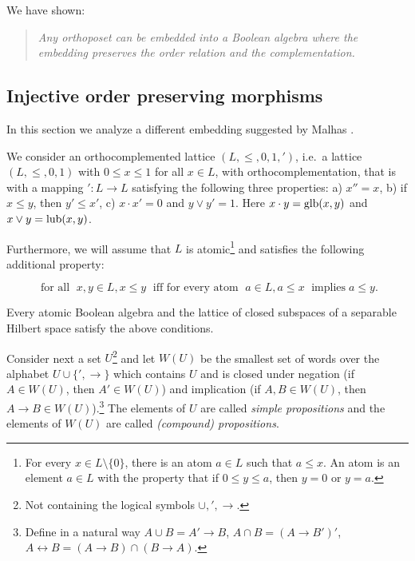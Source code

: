 We have shown:
\begin{quote}
{\em Any orthoposet can be embedded into a Boolean algebra where the
embedding preserves the order relation and the complementation.}
\end{quote}





\subsection{Injective order preserving morphisms}
\label{section:injorder}





In this section we analyze a different embedding suggested by Malhas
\cite{malhas-87,malhas-92}.

We consider
an orthocomplemented lattice $(L, \leq, 0, 1, ')$, i.e.\
a lattice $(L, \leq, 0, 1)$ with $0\leq x\leq 1$
for all $x\in L$, with  orthocomplementation, that is with a mapping
$' : L \rightarrow L$ satisfying the following three properties: a) $x''=x$,
b) if $x\leq y$, then $y'\leq x'$, c) $x\cdot x'=0$ and $y \vee y'=1$. Here
$x\cdot y= {\rm glb} (x,y)$ and $x \vee y = {\rm lub}(x,y) $.


Furthermore, we will assume that $L$ is atomic\footnote{For every
$x\in L\setminus\{0\}$, there is an atom $a\in L$ such that $a\leq x$.
An atom is an element $a\in L$ with the property that if $0\leq y \leq a$,
then $y=0$ or $y=a$.} and satisfies the following additional property:

\begin{equation}
\label{*}
\mbox{ for all }\; x,y \in L, x \leq y \; \mbox{ iff for every atom }\;
a\in L, a\leq x\;
\mbox{ implies} \; a\leq y.
\end{equation}

Every atomic Boolean algebra and the lattice of closed subspaces of a separable
Hilbert space satisfy the above conditions.

Consider next a set $U$\footnote{Not containing the logical symbols $\cup,
', \rightarrow $.}
 and let $W(U)$ be the smallest set of words over the alphabet
$U \cup \{', \rightarrow\}$ which contains $U$ and
is closed under negation (if $A\in W(U)$, then $ A' \in W(U)$) and
implication (if
$A, B
\in W(U)$, then
$A \rightarrow B \in W(U)$).\footnote{Define in a natural way $A \cup B =
A' \rightarrow B$,
$A \cap B =  (A \rightarrow  B')'$, $ A \leftrightarrow B = (A \rightarrow
B) \cap
(B \rightarrow A)$.} The elements of $U$ are called {\it simple
propositions} and
the elements of $W(U)$ are called {\it (compound) propositions}.


